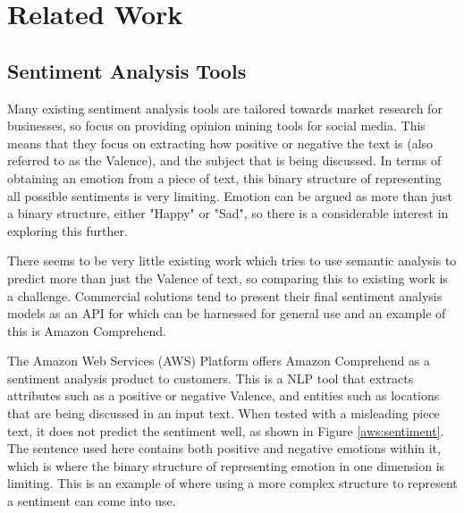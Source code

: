 
\section{Related Work}
\subsection{Sentiment Analysis Tools}

Many existing sentiment analysis tools are tailored towards market research for businesses, so focus on providing opinion mining tools for social media. This means that they focus on extracting how positive or negative the text is (also referred to as the Valence), and the subject that is being discussed. In terms of obtaining an emotion from a piece of text, this binary structure of representing all possible sentiments is very limiting. Emotion can be argued as more than just a binary structure, either "Happy" or "Sad", so there is a considerable interest in exploring this further.

There seems to be very little existing work which tries to use semantic analysis to predict more than just the Valence of text, so comparing this to existing work is a challenge. Commercial solutions tend to present their final sentiment analysis models as an API for which can be harnessed for general use and an example of this is Amazon Comprehend.

The Amazon Web Services (AWS) Platform offers Amazon Comprehend \cite{aws} as a sentiment analysis product to customers. This is a NLP tool that extracts attributes such as a positive or negative Valence, and entities such as locations that are being discussed in an input text. When tested with a misleading piece text, it does not predict the sentiment well, as shown in Figure \ref{aws:sentiment}. The sentence used here contains both positive and negative emotions within it, which is where the binary structure of representing emotion in one dimension is limiting. This is an example of where using a more complex structure to represent a sentiment can come into use. 

